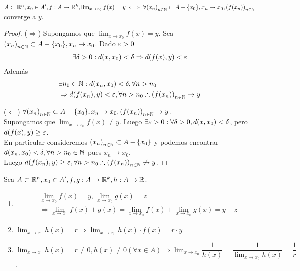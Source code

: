 \begin{prop}
  \(A \subset \mathbb{R}^n, x_0 \in A^{\prime}, f: A \to \mathbb{R}^k, \lim_{x \to x_0} f(x) = y \iff \forall {(x_n)}_{n \in \mathbb{N}} \subset A - \{x_0\}, x_n \to x_0, {(f(x_n))}_{n \in \mathbb{N}} \) converge a \(y\).
  \begin{proof}
    (\(\Rightarrow \)) Supongamos que \(\lim_{x \to x_0} f(x) = y\). Sea \({(x_n)}_{n \in \mathbb{N}} \subset A - \{x_0\}, x_n \to x_0\). Dado \( \varepsilon > 0 \) \begin{align*}
     \exists \delta > 0 : d(x, x_0) < \delta \Rightarrow d(f(x), y) < \varepsilon
    \end{align*} Además \begin{align*}
       & \exists n_0 \in \mathbb{N} : d(x_n, x_0) < \delta, \forall n > n_0                          \\
       & \Rightarrow d(f(x_n), y) < \varepsilon, \forall n > n_0 \therefore {(f(x_n))}_{n \in \mathbb{N}} \to y
    \end{align*}

    (\(\Leftarrow \)) \(\forall {(x_n)}_{n \in \mathbb{N}} \subset A - \{x_0\}, x_n \to x_0, {(f(x_n))}_{n \in \mathbb{N}} \to y\). \\
    Supongamos que \(\lim_{x \to x_0} f(x) \neq y\). Luego \(\exists \varepsilon > 0 : \forall \delta > 0, d(x, x_0) < \delta \), pero \(d(f(x), y) \geq \varepsilon \). \\
    En particular consideremos \({(x_n)}_{n \in \mathbb{N}} \subset A - \{x_0\} \) y podemos encontrar \(d(x_n, x_0) < \delta, \forall n > n_0 \in \mathbb{N} \) pues \(x_n \to x_0\). \\
    Luego \(d(f(x_n), y) \geq \varepsilon, \forall n > n_0 \therefore {(f(x_n))}_{n \in \mathbb{N}} \not \to y\).
  \end{proof}
\end{prop}

\begin{prop}
  Sea \(A \subset \mathbb{R}^n, x_0 \in A^{\prime}, f, g: A \to \mathbb{R}^k, h: A \to \mathbb{R} \).
  \begin{enumerate}
    \item \begin{align*}
             & \lim_{x \to x_0} f(x) = y\text{, } \lim_{x \to x_0} g(x) = z                                   \\
             & \Rightarrow \lim_{x \to x_0} f(x) + g(x) = \lim_{x \to x_0} f(x) + \lim_{x \to x_0} g(x) = y+z
          \end{align*}
    \item \(\lim_{x \to x_0} h(x) = r \Rightarrow \lim_{x \to x_0} h(x) \cdot f(x) = r \cdot y\)
    \item \(\lim_{x \to x_0} h(x) = r \neq 0, h(x) \neq 0 (\forall x \in A) \Rightarrow \lim_{x \to x_0} \dfrac{1}{h(x)} = \dfrac{1}{\lim_{x \to x_0} h(x)} = \dfrac{1}{r} \).
  \end{enumerate}
\end{prop}

